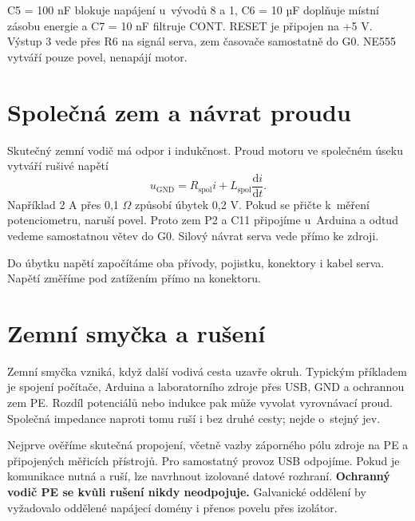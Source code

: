 \noindent\begin{minipage}{\textwidth}\centering

\captionsetup{hypcap=false}
\label{fig:ne555}
\end{minipage}\medskip

C5 = 100 nF blokuje napájení u~vývodů 8 a 1, C6 = 10 µF doplňuje místní zásobu energie a C7 = 10 nF filtruje CONT. RESET je připojen na +5 V. Výstup 3 vede přes R6 na signál serva, zem časovače samostatně do G0. NE555 vytváří pouze povel, nenapájí motor.~\cite{ne555}

\section{Společná zem a návrat proudu}
Skutečný zemní vodič má odpor i indukčnost. Proud motoru ve společném úseku vytváří rušivé napětí
\begin{equation}
 u_\mathrm{GND}=R_\mathrm{spol}i+L_\mathrm{spol}\frac{\mathrm{d}i}{\mathrm{d}t}.
\end{equation}
Například 2 A přes 0,1 $\Omega$ způsobí úbytek 0,2 V. Pokud se přičte k~měření potenciometru, naruší povel. Proto zem P2 a C11 připojíme u~Arduina a odtud vedeme samostatnou větev do G0. Silový návrat serva vede přímo ke zdroji.

\noindent\begin{minipage}{\textwidth}\centering
\resizebox{.90\textwidth}{!}{}
\captionsetup{hypcap=false}
\label{fig:zeme}
\end{minipage}\medskip

Do úbytku napětí započítáme oba přívody, pojistku, konektory i kabel serva. Napětí změříme pod zatížením přímo na konektoru.

\section{Zemní smyčka a rušení}
Zemní smyčka vzniká, když další vodivá cesta uzavře okruh. Typickým příkladem je spojení počítače, Arduina a laboratorního zdroje přes USB, GND a ochrannou zem PE. Rozdíl potenciálů nebo indukce pak může vyvolat vyrovnávací proud. Společná impedance naproti tomu ruší i bez druhé cesty; nejde o~stejný jev.~\cite{osak}

\noindent\begin{minipage}{\textwidth}\centering
\resizebox{.90\textwidth}{!}{}
\captionsetup{hypcap=false}
\end{minipage}\medskip

Nejprve ověříme skutečná propojení, včetně vazby záporného pólu zdroje na PE a připojených měřicích přístrojů. Pro samostatný provoz USB odpojíme. Pokud je komunikace nutná a ruší, lze navrhnout izolované datové rozhraní. \textbf{Ochranný vodič PE se kvůli rušení nikdy neodpojuje.} Galvanické oddělení by vyžadovalo oddělené napájecí domény i přenos povelu přes izolátor.

